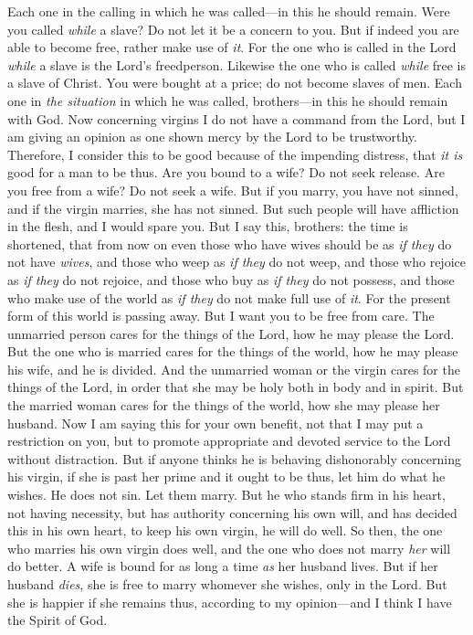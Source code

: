 \begin{biblechapter}
\verse Each one in the calling in which he was called—in this he should remain.
\verse Were you called \textit{while} a slave? Do not let it be a concern to you. But if indeed you are able to become free, rather make use of \textit{it}.
\verse For the one who is called in the Lord \textit{while} a slave is the Lord’s freedperson. Likewise the one who is called \textit{while} free is a slave of Christ.
\verse You were bought at a price; do not become slaves of men.
\verse Each one in \textit{the situation} in which he was called, brothers—in this he should remain with God.
 Now concerning virgins I do not have a command from the Lord, but I am giving an opinion as one shown mercy by the Lord to be trustworthy.
\verse Therefore, I consider this to be good because of the impending distress, that \textit{it is} good for a man to be thus.
\verse Are you bound to a wife? Do not seek release. Are you free from a wife? Do not seek a wife.
\verse But if you marry, you have not sinned, and if the virgin marries, she has not sinned. But such people will have affliction in the flesh, and I would spare you.
\verse But I say this, brothers: the time is shortened, that from now on even those who have wives should be as \textit{if they} do not have \textit{wives},
\verse and those who weep as \textit{if they} do not weep, and those who rejoice as \textit{if they} do not rejoice, and those who buy as \textit{if they} do not possess,
\verse and those who make use of the world as \textit{if they} do not make full use of \textit{it}. For the present form of this world is passing away.
\verse But I want you to be free from care. The unmarried person cares for the things of the Lord, how he may please the Lord.
\verse But the one who is married cares for the things of the world, how he may please his wife,
\verse and he is divided. And the unmarried woman or the virgin cares for the things of the Lord, in order that she may be holy both in body and in spirit. But the married woman cares for the things of the world, how she may please her husband.
\verse Now I am saying this for your own benefit, not that I may put a restriction on you, but to promote appropriate and devoted service to the Lord without distraction.
\verse But if anyone thinks he is behaving dishonorably concerning his virgin, if she is past her prime and it ought to be thus, let him do what he wishes. He does not sin. Let them marry.
\verse But he who stands firm in his heart, not having necessity, but has authority concerning his own will, and has decided this in his own heart, to keep his own virgin, he will do well.
\verse So then, the one who marries his own virgin does well, and the one who does not marry \textit{her} will do better.
\verse A wife is bound for as long a time \textit{as} her husband lives. But if her husband \textit{dies}, she is free to marry whomever she wishes, only in the Lord.
\verse But she is happier if she remains thus, according to my opinion—and I think I have the Spirit of God.
\end{biblechapter}

